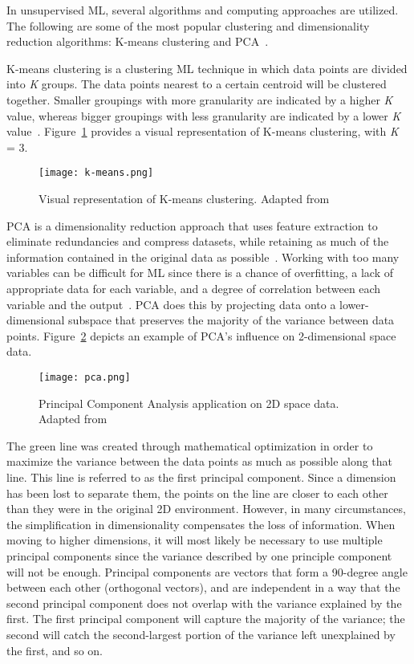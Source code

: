 In unsupervised \gls{ML}, several algorithms and computing approaches are utilized. The following are some of the most popular clustering and dimensionality reduction algorithms: K-means clustering and \gls{PCA}~\cite{Chugh2018TypesKnow}.

K-means clustering is a clustering \gls{ML} technique in which data points are divided into \textit{K} groups. The data points nearest to a certain centroid will be clustered together. Smaller groupings with more granularity are indicated by a higher \textit{K} value, whereas bigger groupings with less granularity are indicated by a lower \textit{K} value~\cite{2020WhatIBMb}. Figure~\ref{fig:k_means} provides a visual representation of K-means clustering, with \textit{K} = 3. 
    
\begin{figure}[htbp]
    \centering
    \texttt{[image: k-means.png]}
    \caption{Visual representation of K-means clustering. Adapted from~\cite{Beaumont2020ImageMedium}}
    \label{fig:k_means}
\end{figure}

\gls{PCA} is a dimensionality reduction approach that uses feature extraction to eliminate redundancies and compress datasets, while retaining as much of the information contained in the original data as possible~\cite{2020WhatIBMb}. Working with too many variables can be difficult for \gls{ML} since there is a chance of overfitting, a lack of appropriate data for each variable, and a degree of correlation between each variable and the output~\cite{Chugh2018TypesKnow}. \gls{PCA} does this by projecting data onto a lower-dimensional subspace that preserves the majority of the variance between data points. Figure~\ref{fig:pca} depicts an example of \gls{PCA}'s influence on 2-dimensional space data.

\begin{figure}[htbp]
    \centering
    \texttt{[image: pca.png]}
    \caption{Principal Component Analysis application on 2D space data. Adapted from~\cite{Patcher2014WhatDNA}}
    \label{fig:pca}
\end{figure}

The green line was created through mathematical optimization in order to maximize the variance between the data points as much as possible along that line. This line is referred to as the first principal component. Since a dimension has been lost to separate them, the points on the line are closer to each other than they were in the original 2D environment. However, in many circumstances, the simplification in dimensionality compensates the loss of information. When moving to higher dimensions, it will most likely be necessary to use multiple principal components since the variance described by one principle component will not be enough. Principal components are vectors that form a 90-degree angle between each other (orthogonal vectors), and are independent in a way that the second principal component does not overlap with the variance explained by the first. The first principal component will capture the majority of the variance; the second will catch the second-largest portion of the variance left unexplained by the first, and so on.


